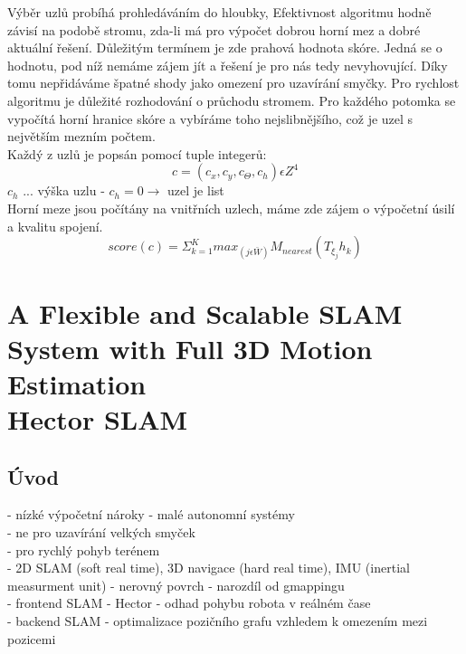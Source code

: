 \documentclass[11pt]{article}
\begin{document}
\indent Výběr uzlů probíhá prohledáváním do hloubky, Efektivnost algoritmu hodně závisí na podobě stromu, zda-li má pro výpočet dobrou horní mez a dobré aktuální řešení. Důležitým termínem je zde prahová hodnota skóre. Jedná se o hodnotu, pod níž nemáme zájem jít a řešení je pro nás tedy nevyhovující. Díky tomu nepřidáváme špatné shody jako omezení pro uzavírání smyčky. Pro rychlost algoritmu je důležité rozhodování o průchodu stromem. Pro každého potomka se vypočítá horní hranice skóre a vybíráme toho nejslibnějšího, což je uzel s největším mezním počtem.\\
\indent Každý z uzlů je popsán pomocí tuple integerů: 
$$c=(c_x,c_y,c_\Theta,c_h)\epsilon Z^4$$
$c_h$ ... výška uzlu - $c_h=0 \rightarrow$ uzel je list\\
\indent Horní meze jsou počítány na vnitřních uzlech, máme zde zájem o výpočetní úsilí a kvalitu spojení. 
$$score(c)=\Sigma_{k=1}^Kmax_{(j\epsilon \bar{W})}M_{nearest}(T_{\xi_j}h_k)$$

\newpage

\section{A Flexible and Scalable SLAM System with Full 3D Motion Estimation \\ Hector SLAM}

\subsection{Úvod}
- nízké výpočetní nároky - malé autonomní systémy\\
- ne pro uzavírání velkých smyček\\
- pro rychlý pohyb terénem\\
- 2D SLAM (soft real time), 3D navigace (hard real time), IMU (inertial measurment unit) - nerovný povrch - narozdíl od gmappingu\\
- frontend SLAM - Hector - odhad pohybu robota v reálném čase\\
- backend SLAM - optimalizace pozičního grafu vzhledem k omezením mezi pozicemi\\
\end{document}
